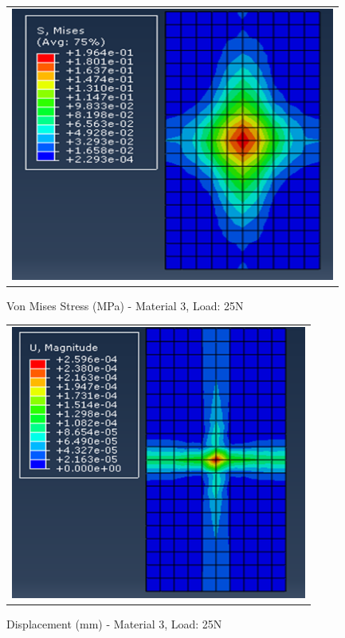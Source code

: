 \documentclass[a4paper,12pt]{article}
\numberwithin{equation}{section}
\numberwithin{figure}{section}
\begin{document}
\begin{figure}[H]
  \centering
  \begin{tabular}{@{}c@{}}
    \includegraphics[width=0.7\linewidth,height=255pt]{Results/Point Loading/M3_VMS_L5.png} \\
  \end{tabular}
  \caption{Von Mises Stress (MPa) - Material 3, Load: 25N}
\end{figure}

\begin{figure}[H]
  \centering
  \begin{tabular}{@{}c@{}}
    \includegraphics[width=0.7\linewidth,height=255pt]{Results/Point Loading/M3_DIS_L5.png} \\
  \end{tabular}
  \caption{Displacement (mm) - Material 3, Load: 25N}
\end{figure}
\end{document}
